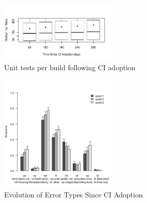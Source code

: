\documentclass[conference]{IEEEtran}
\begin{document}
\begin{figure}[!t]
\centering
\includegraphics[width=0.5\textwidth]{tests.pdf}
\caption{Unit tests per build following CI adoption}
\label{Fig:Tests}
\end{figure}



\begin{figure}[!t]
\centering
\includegraphics[width=0.5\textwidth]{plot_together.png}
\caption{Evolution of Error Types Since CI Adoption}
\label{Fig:BugTypes}
\end{figure}

\balance



\end{document}
